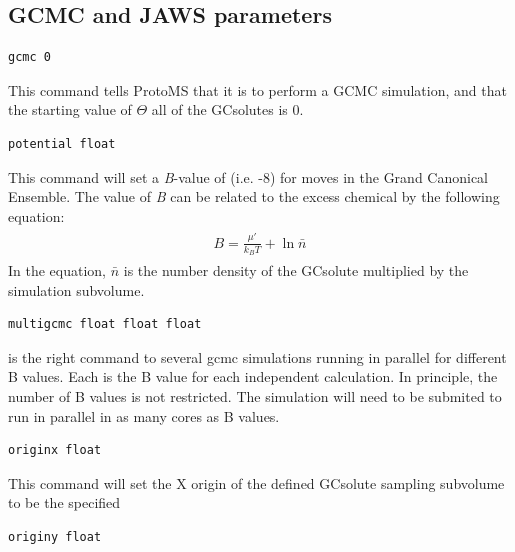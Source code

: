 \documentclass[letterpaper,10pt,english]{sphinxmanual}
\begin{document}
\subsection{GCMC and JAWS parameters}
\label{protoms:gcmc-and-jaws-parameters}
\begin{Verbatim}[commandchars=\\\{\}]
gcmc 0
\end{Verbatim}

This command tells ProtoMS that it is to perform a GCMC simulation, and that the starting value of \(\Theta\) all of the GCsolutes is 0.

\begin{Verbatim}[commandchars=\\\{\}]
potential float
\end{Verbatim}

This command will set a \emph{B}-value of  (i.e. -8) for moves in the Grand Canonical Ensemble. The value of \emph{B} can be related to the excess chemical by the following equation:
\label{protoms:equation-bval}\begin{gather}
\begin{split}B = \frac{\mu'}{k_{B}T}+\ln \bar{n}\end{split}\label{protoms-bval}
\end{gather}
In the equation, \(\bar{n}\) is the number density of the GCsolute multiplied by the simulation subvolume.

\begin{Verbatim}[commandchars=\\\{\}]
multigcmc float float float
\end{Verbatim}

is the right command to several gcmc simulations running in parallel for different B values. Each  is the B value for each independent calculation. In principle, the number of B values is not restricted. The simulation will need to be submited to run in parallel in as many cores as B values.

\begin{Verbatim}[commandchars=\\\{\}]
originx float
\end{Verbatim}

This command will set the X origin of the defined GCsolute sampling subvolume to be the specified 

\begin{Verbatim}[commandchars=\\\{\}]
originy float
\end{Verbatim}
\end{document}
